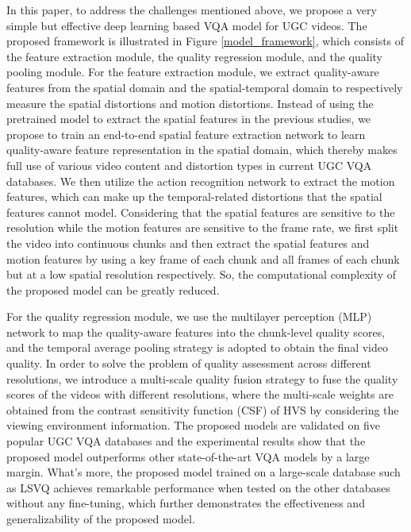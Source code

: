 \documentclass[sigconf]{acmart}
\begin{document}
In this paper, to address the challenges mentioned above, we propose a very simple but effective deep learning based VQA model for UGC videos. The proposed framework is illustrated in Figure \ref{model_framework}, which consists of the feature extraction module, the quality regression module, and the quality pooling module.
For the feature extraction module, we extract quality-aware features from the spatial domain and the spatial-temporal domain to respectively measure the spatial distortions and motion distortions. Instead of using the pretrained model to extract the spatial features in the previous studies, we propose to train an end-to-end spatial feature extraction network to learn quality-aware feature representation in the spatial domain, which thereby makes full use of various video content and distortion types in current UGC VQA databases.
We then utilize the action recognition network to extract the motion features, which can make up the temporal-related distortions that the spatial features cannot model. Considering that the spatial features are sensitive to the resolution while the motion features are sensitive to the frame rate, we first split the video into continuous chunks and then extract the spatial features and motion features by using a key frame of each chunk and all frames of each chunk but at a low spatial resolution respectively. So, the computational complexity of the proposed model can be greatly reduced.

For the quality regression module, we use the multilayer perception (MLP) network to map the quality-aware features into the chunk-level quality scores, and the temporal average pooling strategy is adopted to obtain the final video quality. In order to solve the problem of quality assessment across different resolutions, we introduce a multi-scale quality fusion strategy to fuse the quality scores of the videos with different resolutions, where the multi-scale weights are obtained from the contrast sensitivity function (CSF) of HVS by considering the viewing environment information. The proposed models are validated on five popular UGC VQA databases and the experimental results show that the proposed model outperforms other state-of-the-art VQA models by a large margin. What's more, the proposed model trained on a large-scale database such as LSVQ \cite{ying2021patch} achieves remarkable performance when tested on the other databases without any fine-tuning, which further demonstrates the effectiveness and generalizability of the proposed model.
\end{document}
